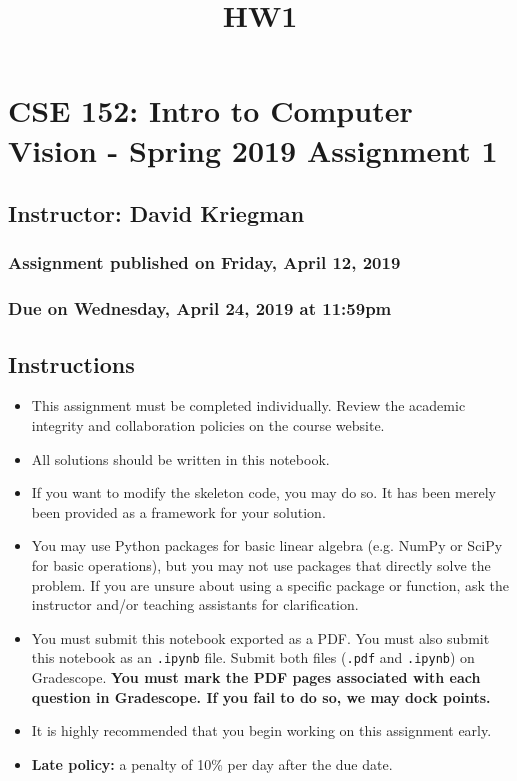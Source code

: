 \documentclass[11pt]{article}
\title{HW1}
\providecommand{\tightlist}{%
      \setlength{\itemsep}{0pt}\setlength{\parskip}{0pt}}
\begin{document}
    
    
    \maketitle
    
    

    
    \section{CSE 152: Intro to Computer Vision - Spring 2019 Assignment
1}\label{cse-152-intro-to-computer-vision---spring-2019-assignment-1}

\subsection{Instructor: David Kriegman}\label{instructor-david-kriegman}

\subsubsection{Assignment published on Friday, April 12,
2019}\label{assignment-published-on-friday-april-12-2019}

\subsubsection{Due on Wednesday, April 24, 2019 at
11:59pm}\label{due-on-wednesday-april-24-2019-at-1159pm}

\subsection{Instructions}\label{instructions}

\begin{itemize}
\tightlist
\item
  This assignment must be completed individually. Review the academic
  integrity and collaboration policies on the course website.
\item
  All solutions should be written in this notebook.
\item
  If you want to modify the skeleton code, you may do so. It has been
  merely been provided as a framework for your solution.
\item
  You may use Python packages for basic linear algebra (e.g. NumPy or
  SciPy for basic operations), but you may not use packages that
  directly solve the problem. If you are unsure about using a specific
  package or function, ask the instructor and/or teaching assistants for
  clarification.
\item
  You must submit this notebook exported as a PDF. You must also submit
  this notebook as an \texttt{.ipynb} file. Submit both files
  (\texttt{.pdf} and \texttt{.ipynb}) on Gradescope. \textbf{You must
  mark the PDF pages associated with each question in Gradescope. If you
  fail to do so, we may dock points.}
\item
  It is highly recommended that you begin working on this assignment
  early.
\item
  \textbf{Late policy:} a penalty of 10\% per day after the due date.
\end{itemize}
\end{document}
